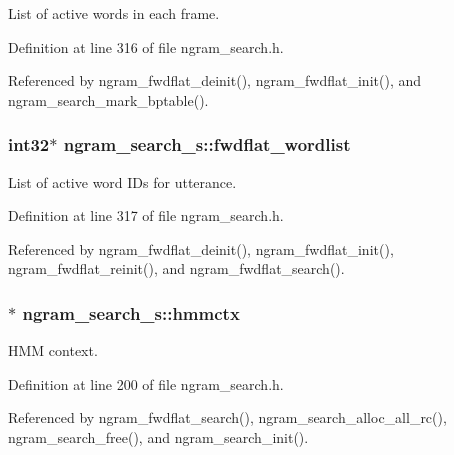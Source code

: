 List of active words in each frame. 



Definition at line 316 of file ngram\+\_\+search.\+h.



Referenced by ngram\+\_\+fwdflat\+\_\+deinit(), ngram\+\_\+fwdflat\+\_\+init(), and ngram\+\_\+search\+\_\+mark\+\_\+bptable().

\subsubsection[{fwdflat\+\_\+wordlist}]{\setlength{\rightskip}{0pt plus 5cm}int32$\ast$ ngram\+\_\+search\+\_\+s\+::fwdflat\+\_\+wordlist}\label{structngram__search__s_a774f1640c5ece856f4bef98d98e7c959}


List of active word I\+Ds for utterance. 



Definition at line 317 of file ngram\+\_\+search.\+h.



Referenced by ngram\+\_\+fwdflat\+\_\+deinit(), ngram\+\_\+fwdflat\+\_\+init(), ngram\+\_\+fwdflat\+\_\+reinit(), and ngram\+\_\+fwdflat\+\_\+search().

\subsubsection[{hmmctx}]{$\ast$ ngram\+\_\+search\+\_\+s\+::hmmctx}\label{structngram__search__s_acfbdd34e3dadbaa384818402f1dd59bf}


H\+M\+M context. 



Definition at line 200 of file ngram\+\_\+search.\+h.



Referenced by ngram\+\_\+fwdflat\+\_\+search(), ngram\+\_\+search\+\_\+alloc\+\_\+all\+\_\+rc(), ngram\+\_\+search\+\_\+free(), and ngram\+\_\+search\+\_\+init().

